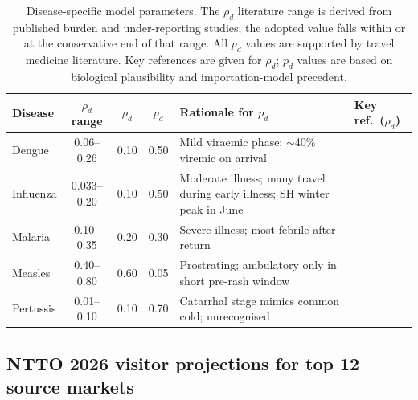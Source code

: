 \documentclass[12pt]{article}
\begin{document}
\begin{table}[h!]
\centering
\caption{Disease-specific model parameters. The $\rho_d$ literature
  range is derived from published burden and under-reporting studies;
  the adopted value falls within or at the conservative end of that
  range. All $p_d$ values are supported by travel medicine literature.
  Key references are given for $\rho_d$; $p_d$ values are based on
  biological plausibility and importation-model precedent.}
\label{tab:params}
\small
\begin{tabular}{lcccp{3.5cm}p{3.2cm}}
\toprule
\textbf{Disease}
  & \textbf{$\rho_d$ range}
  & \textbf{$\rho_d$}
  & \textbf{$p_d$}
  & \textbf{Rationale for $p_d$}
  & \textbf{Key ref.\ ($\rho_d$)} \\
\midrule
Dengue
  & 0.06--0.26 & 0.10 & 0.50
  & Mild viraemic phase; $\sim$40\% viremic on arrival
  & \cite{bhatt2013,undurraga2013} \\[3pt]
Influenza
  & 0.033--0.20 & 0.10 & 0.50
  & Moderate illness; many travel during early illness; SH winter peak in June
  & \cite{WHO_immunization} \\[3pt]
Malaria
  & 0.10--0.35 & 0.20 & 0.30
  & Severe illness; most febrile after return
  & \cite{whoWMR2024} \\[3pt]
Measles
  & 0.40--0.80 & 0.60 & 0.05
  & Prostrating; ambulatory only in short pre-rash window
  & \cite{simons2012} \\[3pt]
Pertussis
  & 0.01--0.10 & 0.10 & 0.70
  & Catarrhal stage mimics common cold; unrecognised
  & \cite{mclaughlin2016} \\
\bottomrule
\end{tabular}
\normalsize
\end{table}

\subsection*{NTTO 2026 visitor projections for top 12 source markets}
\end{document}
